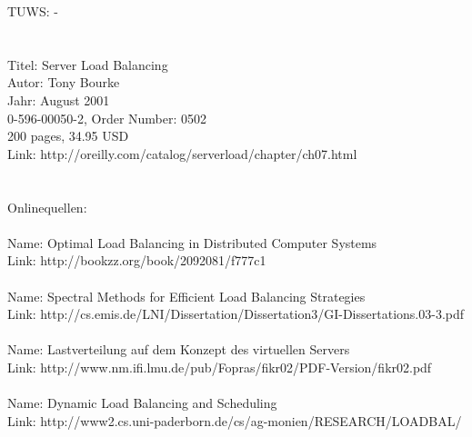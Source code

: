 \documentclass[12p]{article}
\begin{document}
	TUWS:     -\\
	\\
	\\
	Titel:     Server Load Balancing\\
	Autor:     Tony Bourke\\
	Jahr:     August 2001\\
	0-596-00050-2, Order Number: 0502\\
	200 pages, 34.95 USD\\
	Link: http://oreilly.com/catalog/serverload/chapter/ch07.html\\
	\\
	\\
	Onlinequellen:\\
	\\
	Name:    Optimal Load Balancing in Distributed Computer Systems\\
	Link:    http://bookzz.org/book/2092081/f777c1\\
	\\
	Name:    Spectral Methods for Efficient Load Balancing Strategies\\
	Link:    http://cs.emis.de/LNI/Dissertation/Dissertation3/GI-Dissertations.03-3.pdf\\
	\\
	Name:    Lastverteilung auf dem Konzept des virtuellen Servers\\
	Link:    http://www.nm.ifi.lmu.de/pub/Fopras/fikr02/PDF-Version/fikr02.pdf\\
	\\
	Name: Dynamic Load Balancing and Scheduling\\
	Link: http://www2.cs.uni-paderborn.de/cs/ag-monien/RESEARCH/LOADBAL/\\
	\\
	
\end{document}
